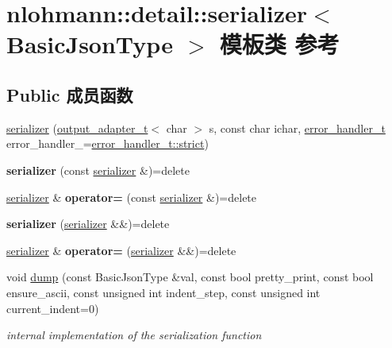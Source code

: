 \hypertarget{classnlohmann_1_1detail_1_1serializer}{}\section{nlohmann\+::detail\+::serializer$<$ Basic\+Json\+Type $>$ 模板类 参考}
\label{classnlohmann_1_1detail_1_1serializer}
\subsection*{Public 成员函数}
\begin{DoxyCompactItemize}
\item 
\mbox{\hyperlink{classnlohmann_1_1detail_1_1serializer_ac010525281d97867ee842da37294fe83}{serializer}} (\mbox{\hyperlink{namespacenlohmann_1_1detail_a9b680ddfb58f27eb53a67229447fc556}{output\+\_\+adapter\+\_\+t}}$<$ char $>$ s, const char ichar, \mbox{\hyperlink{namespacenlohmann_1_1detail_a5a76b60b26dc8c47256a996d18d967df}{error\+\_\+handler\+\_\+t}} error\+\_\+handler\+\_\+=\mbox{\hyperlink{namespacenlohmann_1_1detail_a5a76b60b26dc8c47256a996d18d967dfa2133fd717402a7966ee88d06f9e0b792}{error\+\_\+handler\+\_\+t\+::strict}})
\item 
\mbox{\label{classnlohmann_1_1detail_1_1serializer_ae3771351ec4cb892bec707edeb56dc31}} 
{\bfseries serializer} (const \mbox{\hyperlink{classnlohmann_1_1detail_1_1serializer}{serializer}} \&)=delete
\item 
\mbox{\label{classnlohmann_1_1detail_1_1serializer_a5f14c33012477b9f9876dc54d97009a0}} 
\mbox{\hyperlink{classnlohmann_1_1detail_1_1serializer}{serializer}} \& {\bfseries operator=} (const \mbox{\hyperlink{classnlohmann_1_1detail_1_1serializer}{serializer}} \&)=delete
\item 
\mbox{\label{classnlohmann_1_1detail_1_1serializer_a28081304e70cca6b3042c101ee5c498c}} 
{\bfseries serializer} (\mbox{\hyperlink{classnlohmann_1_1detail_1_1serializer}{serializer}} \&\&)=delete
\item 
\mbox{\label{classnlohmann_1_1detail_1_1serializer_acaafe3436ee5fb74777eb4132a88c513}} 
\mbox{\hyperlink{classnlohmann_1_1detail_1_1serializer}{serializer}} \& {\bfseries operator=} (\mbox{\hyperlink{classnlohmann_1_1detail_1_1serializer}{serializer}} \&\&)=delete
\item 
void \mbox{\hyperlink{classnlohmann_1_1detail_1_1serializer_a95460ebd1a535a543e5a0ec52e00f48b}{dump}} (const Basic\+Json\+Type \&val, const bool pretty\+\_\+print, const bool ensure\+\_\+ascii, const unsigned int indent\+\_\+step, const unsigned int current\+\_\+indent=0)
\begin{DoxyCompactList}\small\item\em internal implementation of the serialization function \end{DoxyCompactList}\end{DoxyCompactItemize}



